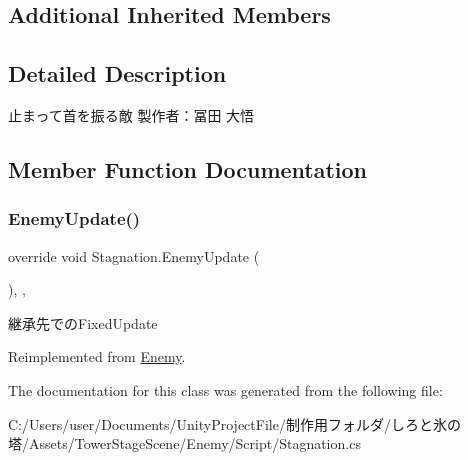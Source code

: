 \subsection*{Additional Inherited Members}


\subsection{Detailed Description}
止まって首を振る敵 製作者：冨田 大悟 



\subsection{Member Function Documentation}
\mbox{\label{class_stagnation_ae0fe7818f0319e53bf2f25d8659af12f}} 
\subsubsection{\texorpdfstring{Enemy\+Update()}{EnemyUpdate()}}
{\footnotesize\ttfamily override void Stagnation.\+Enemy\+Update (\begin{DoxyParamCaption}{ }\end{DoxyParamCaption})\hspace{0.3cm}{\ttfamily [inline]}, {\ttfamily [protected]}, {\ttfamily [virtual]}}



継承先での\+Fixed\+Update 



Reimplemented from \hyperlink{class_enemy_ab19a73003a5b443ba93f4b6a45c0abad}{Enemy}.



The documentation for this class was generated from the following file\+:\begin{DoxyCompactItemize}
\item 
C\+:/\+Users/user/\+Documents/\+Unity\+Project\+File/制作用フォルダ/しろと氷の塔/\+Assets/\+Tower\+Stage\+Scene/\+Enemy/\+Script/Stagnation.\+cs\end{DoxyCompactItemize}
